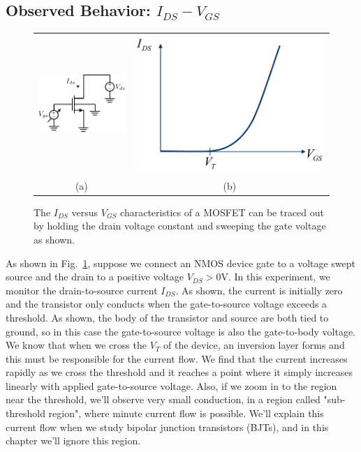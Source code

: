\subsection{Observed Behavior: \texorpdfstring{$I_{DS}-V_{GS}$}{Drain Current vs. Gate Voltage}}
\begin{figure}[tb]
\centering
\begin{tabular}{cc}
\includegraphics[width=.35\columnwidth]{idvgs_sweep} &
\includegraphics[width=.55\columnwidth]{mos_ids_vgs}\\
(a) & (b)\\
\end{tabular}
\caption{The $I_{DS}$ versus $V_{GS}$ characteristics of a MOSFET can be traced out by holding the drain voltage constant and sweeping the gate voltage as shown.}
\label{fig:idvgs_sweep}
\end{figure}
As shown in Fig.~\ref{fig:idvgs_sweep}, suppose we connect an NMOS device gate to a voltage swept source and the drain to a positive voltage $V_{DS} > 0$V.  In this experiment, we monitor the drain-to-source current $I_{DS}$.  As shown, the current is initially zero and the transistor only conducts when the gate-to-source voltage exceeds a threshold.  As shown, the body of the transistor and source are both tied to ground, so in this case the gate-to-source voltage is also the gate-to-body voltage.  We know that when we cross the $V_T$ of the device, an inversion layer forms and this must be responsible for the current flow.
We find that the current increases rapidly as we cross the threshold and it reaches a point where it simply increases linearly with applied gate-to-source voltage.  Also, if we zoom in to the region near the threshold, we'll observe very small conduction, in a region called "sub-threshold region", where minute current flow is possible.  We'll explain this current flow when we study bipolar junction transistors (BJTs), and in this chapter we'll ignore this region.  
